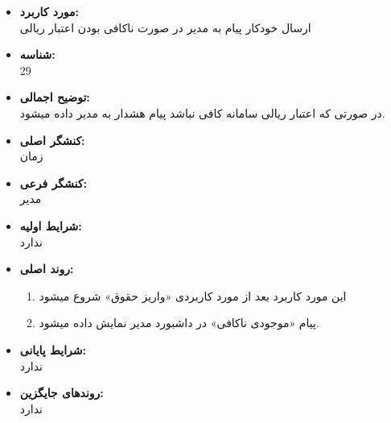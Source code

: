 \documentclass{article}
\begin{document}
\begin{itemize}
\item \textbf{مورد کاربرد:}\\
ارسال خودکار پیام به مدیر در صورت ناکافی بودن اعتبار ریالی
\item \textbf{شناسه:}\\
29
\item \textbf{توضیح اجمالی:}\\
در صورتی که اعتبار ریالی سامانه کافی نباشد پیام هشدار به مدیر داده میشود.
\item \textbf{کنشگر اصلی:}\\
زمان
\item \textbf{کنشگر فرعی:}\\
مدیر
\item \textbf{شرایط اولیه:}\\
ندارد
\item \textbf{روند اصلی:}\\
\begin{enumerate}
\item  این مورد کاربرد بعد از مورد کاربردی «واریز حقوق» شروع میشود
\item پیام «موجودی ناکافی» در داشبورد مدیر نمایش داده میشود.
\end{enumerate}
\item \textbf{شرایط پایانی:}\\ 
ندارد
\item \textbf{روندهای جایگزین:}\\
ندارد
\end{itemize}
\noindent\makebox[\linewidth]{\rule{\paperwidth}{0.4pt}}
\end{document}
